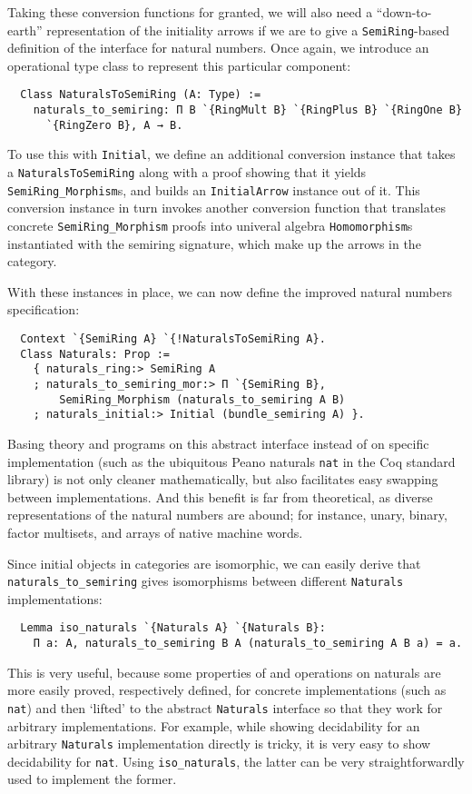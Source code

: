 \documentclass[a4paper,10pt,runningheads]{llncs}
\begin{document}
Taking these conversion functions for granted, we will also need a ``down-to-earth'' representation of the initiality arrows if we are to give a \lstinline|SemiRing|-based definition of the interface for natural numbers. Once again, we introduce an operational type class to represent this particular component:
\begin{lstlisting}
  Class NaturalsToSemiRing (A: Type) :=
    naturals_to_semiring: Π B `{RingMult B} `{RingPlus B} `{RingOne B}
      `{RingZero B}, A → B.
\end{lstlisting}
To use this with \lstinline|Initial|, we define an additional conversion instance that takes a \lstinline|NaturalsToSemiRing| along with a proof showing that it yields \mbox{\lstinline|SemiRing_Morphism|s}, and builds an \lstinline|InitialArrow| instance out of it. This conversion instance in turn invokes another conversion function that translates concrete \lstinline|SemiRing_Morphism| proofs into univeral algebra \lstinline|Homomorphism|s instantiated with the semiring signature, which make up the arrows in the category.

With these instances in place, we can now define the improved natural numbers specification:
\begin{lstlisting}
  Context `{SemiRing A} `{!NaturalsToSemiRing A}.
  Class Naturals: Prop :=
    { naturals_ring:> SemiRing A
    ; naturals_to_semiring_mor:> Π `{SemiRing B},
        SemiRing_Morphism (naturals_to_semiring A B)
    ; naturals_initial:> Initial (bundle_semiring A) }.
\end{lstlisting}
Basing theory and programs on this abstract interface instead of on specific implementation (such as the ubiquitous Peano naturals \lstinline|nat| in the Coq standard library) is not only cleaner mathematically, but also facilitates easy swapping between implementations. And this benefit is far from theoretical, as diverse representations of the natural numbers are abound; for instance, unary, binary, factor multisets, and arrays of native machine words.

Since initial objects in categories are isomorphic, we can easily derive that \lstinline|naturals_to_semiring| gives isomorphisms between different \lstinline|Naturals| implementations:
\begin{lstlisting}
  Lemma iso_naturals `{Naturals A} `{Naturals B}:
    Π a: A, naturals_to_semiring B A (naturals_to_semiring A B a) = a.
\end{lstlisting}
This is very useful, because some properties of and operations on naturals are more easily proved, respectively defined, for concrete implementations (such as \lstinline|nat|) and then `lifted' to the abstract \lstinline|Naturals| interface so that they work for arbitrary implementations. For example, while showing decidability for an arbitrary \lstinline|Naturals| implementation directly is tricky, it is very easy to show decidability for \lstinline|nat|. Using \lstinline|iso_naturals|, the latter can be very straightforwardly used to implement the former.
\end{document}
